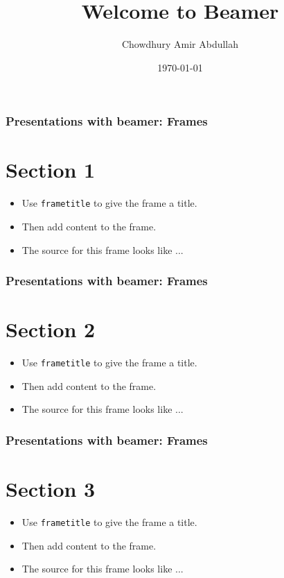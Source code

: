 \documentclass{beamer}
\title{Welcome to Beamer}
\author{Chowdhury Amir Abdullah}
\institute{University of Dhaka}
\date{\today}
\begin{document}
\begin{frame}
\maketitle
\end{frame}




\begin{frame}
\frametitle{Presentations with beamer: Frames}
\section{Section 1}
\tableofcontents[currentsection]
\begin{itemize}
\item Use \texttt{frametitle} to give the frame a title.
\item Then add content to the frame.
\item The source for this frame looks like ...
\end{itemize}
\end{frame}




\begin{frame}
\frametitle{Presentations with beamer: Frames}
\section{Section 2}
\tableofcontents[currentsection]
\begin{itemize}
\item Use \texttt{frametitle} to give the frame a title.
\item Then add content to the frame.
\item The source for this frame looks like ...
\end{itemize}
\end{frame}




\begin{frame}
\frametitle{Presentations with beamer: Frames}
\section{Section 3}
\tableofcontents[currentsection]
\begin{itemize}
\item Use \texttt{frametitle} to give the frame a title.
\item Then add content to the frame.
\item The source for this frame looks like ...
\end{itemize}
\end{frame}
\end{document}
